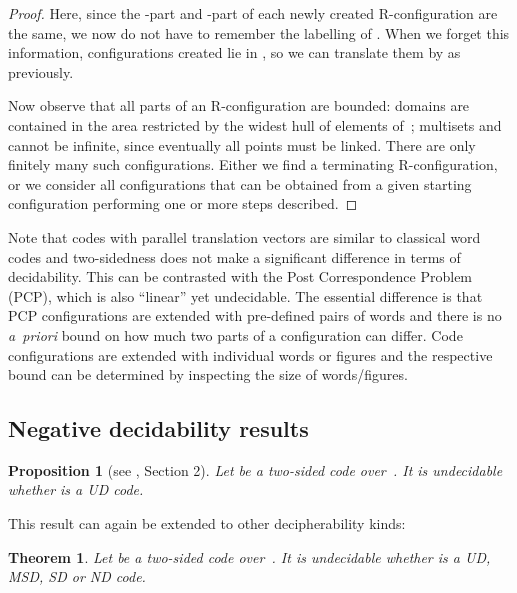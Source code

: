 \documentclass[final,nomarks]{dmtcs-episciences}
\newtheorem{theorem}{Theorem}
\newtheorem{proposition}{Proposition}
\begin{document}
\begin{proof}
Here, since the -part and -part of each newly created
R-configuration are the same, we now do not have to remember the
labelling of . When we forget this information,
configurations created lie in , so we can translate
them by  as previously.

Now observe that all parts of an R-configuration are bounded:
domains are contained in the area restricted by the widest hull
of elements of~; multisets  and
 cannot be infinite, since eventually all
points must be linked. There are only finitely many such
configurations. Either we find a terminating R-configuration, or
we consider all configurations that can be obtained from a given
starting configuration performing one or more steps
described.
\end{proof}


Note that codes with parallel translation vectors are similar to classical
word codes and two-sidedness does not make a significant difference in terms
of decidability. This can be contrasted with the Post Correspondence Problem (PCP),
which is also ``linear'' yet undecidable. The essential difference is that PCP
configurations are extended with pre-defined pairs of words and there is no
\textit{a~priori} bound on how much two parts of a configuration can differ.
Code configurations are extended with individual words or figures and 
the respective bound can be determined by inspecting the size of words/figures.

 
\subsection{Negative decidability results}


\begin{proposition}[see \cite{KolRAIRO}, Section 2]\label{prop:UDundecid}
Let  be a two-sided code over~. It is undecidable whether 
is a UD code.
\end{proposition}

This result can again be extended to other decipherability kinds:

\begin{theorem}\label{th:undec}
Let  be a two-sided code over~. It is undecidable whether 
is a UD, MSD, SD or ND code.
\end{theorem}
\end{document}

